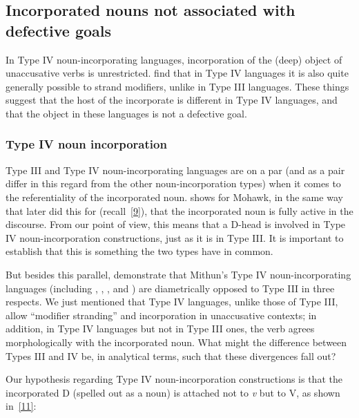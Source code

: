 \documentclass[output=paper]{langsci/langscibook}
\begin{document}
\begin{refcontext}
\subsection{Incorporated nouns not associated with defective goals}
\label{sec:16.2.3}
In Type IV noun-incorporating languages, incorporation of the (deep) object of
unaccusative verbs is unrestricted. \cite{bakeretal05} find that in Type IV
languages it is also quite generally possible to strand modifiers, unlike in
Type III languages. These things suggest that the host of the incorporate is
different in Type IV languages, and that the object in these languages is not a
defective goal.

\subsubsection{Type IV noun incorporation}
Type III and Type IV noun-incorporating languages are on a par (and as a pair
differ in this regard from the other noun-incorporation types) when it comes to
the referentiality of the incorporated noun. \citet[287--288 and sect.
7.4.3]{baker96} shows for Mohawk, in the same way that  \cite{bakeretal05}
later did this for  (recall~\eqref{9}), that the incorporated noun is
fully active in the discourse.  From our point of view, this means that a
D-head is involved in Type IV noun-incorporation constructions, just as it is
in Type III. It is important to establish that this is something the two types
have in common.

But besides this parallel, \cite{bakeretal05} demonstrate that Mithun’s Type IV
noun-incorporating languages (including , ,
, and ) are diametrically opposed to Type III in three respects. We just
mentioned that Type IV languages, unlike those of Type III, allow \enquote{modifier
stranding} and incorporation in unaccusative contexts; in addition, in Type IV
languages but not in Type III ones, the verb agrees morphologically with the
incorporated noun.  What might the difference between Types III and IV be, in
analytical terms, such that these divergences fall out?

Our hypothesis regarding Type IV noun-incorporation constructions is that the
incorporated D (spelled out as a noun) is attached not to \emph{v} but to V,
as shown in~\eqref{11}:


\end{refcontext}
\end{document}
